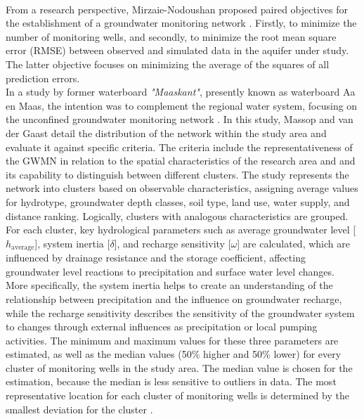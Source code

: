 \\
From a research perspective, Mirzaie-Nodoushan proposed paired objectives for the establishment of a groundwater monitoring network \cite{mirzaie-nodoushan-2017}. Firstly, to minimize the number of monitoring wells, and secondly, to minimize the root mean square error (RMSE) between observed and simulated data in the aquifer under study. The latter objective focuses on minimizing the average of the squares of all prediction errors. \\
In a study by former waterboard \textit{"Maaskant"}, presently known as waterboard Aa en Maas, the intention was to complement the regional water system, focusing on the unconfined groundwater monitoring network \cite{massop-2003}. In this study, Massop and van der Gaast detail the distribution of the network within the study area and evaluate it against specific criteria. The criteria include the representativeness of the GWMN in relation to the spatial characteristics of the research area and and its capability to distinguish between different clusters. The study represents the network into clusters based on observable characteristics, assigning average values for hydrotype, groundwater depth classes, soil type, land use, water supply, and distance ranking. Logically, clusters with analogous characteristics are grouped. For each cluster, key hydrological parameters such as average groundwater level [\(h_{\text{average}}\)], system inertia [\(\delta\)], and recharge sensitivity [\(\omega\)] are calculated, which are influenced by drainage resistance and the storage coefficient, affecting groundwater level reactions to precipitation and surface water level changes.  More specifically, the system inertia helps to create an understanding of the relationship between precipitation and the influence on groundwater recharge, while the recharge sensitivity describes the sensitivity of the groundwater system to changes through external influences as precipitation or local pumping activities. The minimum and maximum values for these three parameters are estimated, as well as the median values (50\% higher and 50\% lower) for every cluster of monitoring wells in the study area. The median value is chosen for the estimation, because the median is less sensitive to outliers in data. The most representative location for each cluster of monitoring wells is determined by the smallest deviation for the cluster \cite{massop-2003}. \\
\\
